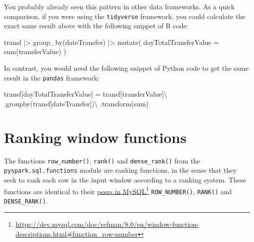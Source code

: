 \documentclass[
  11pt,
  letterpaper,
  DIV=11,
  numbers=noendperiod]{scrreprt}
\newenvironment{Shaded}{\begin{snugshade}}{\end{snugshade}}
\newcommand{\AttributeTok}[1]{\textcolor[rgb]{0.40,0.45,0.13}{#1}}
\newcommand{\FunctionTok}[1]{\textcolor[rgb]{0.28,0.35,0.67}{#1}}
\newcommand{\NormalTok}[1]{\textcolor[rgb]{0.00,0.23,0.31}{#1}}
\newcommand{\OperatorTok}[1]{\textcolor[rgb]{0.37,0.37,0.37}{#1}}
\newcommand{\SpecialCharTok}[1]{\textcolor[rgb]{0.37,0.37,0.37}{#1}}
\newcommand{\StringTok}[1]{\textcolor[rgb]{0.13,0.47,0.30}{#1}}
\begin{document}
You probably already seen this pattern in other data frameworks. As a
quick comparison, if you were using the \texttt{tidyverse} framework,
you could calculate the exact same result above with the following
snippet of R code:

\begin{Shaded}
\begin{Highlighting}[]
\NormalTok{transf }\SpecialCharTok{|\textgreater{}}
    \FunctionTok{group\_by}\NormalTok{(dateTransfer) }\SpecialCharTok{|\textgreater{}}
    \FunctionTok{mutate}\NormalTok{(}
        \AttributeTok{dayTotalTransferValue =} \FunctionTok{sum}\NormalTok{(transferValue)}
\NormalTok{    )}
\end{Highlighting}
\end{Shaded}

In contrast, you would need the following snippet of Python code to get
the same result in the \texttt{pandas} framework:

\begin{Shaded}
\begin{Highlighting}[]
\NormalTok{transf[}\StringTok{\textquotesingle{}dayTotalTransferValue\textquotesingle{}}\NormalTok{] }\OperatorTok{=}\NormalTok{ transf[}\StringTok{\textquotesingle{}transferValue\textquotesingle{}}\NormalTok{]}\OperatorTok{\textbackslash{}}
\NormalTok{    .groupby(transf[}\StringTok{\textquotesingle{}dateTransfer\textquotesingle{}}\NormalTok{])}\OperatorTok{\textbackslash{}}
\NormalTok{    .transform(}\StringTok{\textquotesingle{}sum\textquotesingle{}}\NormalTok{)}
\end{Highlighting}
\end{Shaded}

\hypertarget{ranking-window-functions}{%
\section{Ranking window functions}\label{ranking-window-functions}}

The functions \texttt{row\_number()}, \texttt{rank()} and
\texttt{dense\_rank()} from the \texttt{pyspark.sql.functions} module
are ranking functions, in the sense that they seek to rank each row in
the input window according to a ranking system. These functions are
identical to their
\href{https://dev.mysql.com/doc/refman/8.0/en/window-function-descriptions.html\#function_row-number}{peers
in MySQL}\footnote{\url{https://dev.mysql.com/doc/refman/8.0/en/window-function-descriptions.html\#function_row-number}}
\texttt{ROW\_NUMBER()}, \texttt{RANK()} and \texttt{DENSE\_RANK()}.
\end{document}
